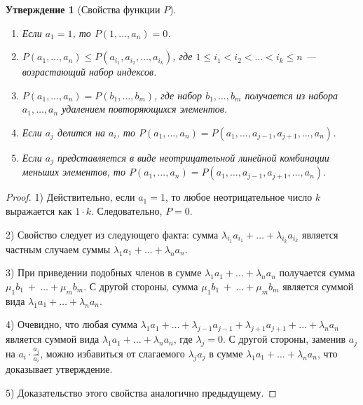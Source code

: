 \documentclass[12pt]{article}
\newtheorem{proposition}[theorem]{Утверждение}
\theoremstyle{definition}
\begin{document}
\begin{proposition}[Свойства функции $P$]{\ }
\label{propertiesOfP}
\begin{enumerate}
    \item Если $a_1 = 1$, то $P(1, \dots, a_n) = 0$.
    \item $P(a_1, \dots, a_n) \le P(a_{i_1} , a_{i_2}, \dots, a_{i_k})$, где $1 \le i_1 < i_2 < \dots < i_k \le n$ --- возрастающий набор индексов.
    \item $P(a_1, \dots, a_n) = P(b_1, \dots, b_m)$, где набор $b_1, \dots, b_m$ получается из набора $a_1, \dots, a_n$ удалением повторяющихся элементов.
    \item Если $a_j$ делится на $a_i$, то $P(a_1, \dots, a_n) = P(a_1, \dots, a_{j - 1}, a_{j + 1}, \dots, a_n)$.
    
    \item Если $a_j$ представляется в виде неотрицательной линейной комбинации меньших элементов, то $P(a_1, \dots, a_n) = P(a_1, \dots, a_{j - 1}, a_{j + 1}, \dots, a_n)$.
\end{enumerate}
\end{proposition}
\begin{proof}
1) Действительно, если $a_1 = 1$, то любое неотрицательное число $k$ выражается как $1 \cdot k$. Следовательно, $P = 0$.

2) Свойство следует из следующего факта: сумма $\lambda_{i_1} a_{i_1} + \dots + \lambda_{i_k} a_{i_k}$ является частным случаем суммы $\lambda_1 a_1 + \dots + \lambda_n a_n$.

3) При приведении подобных членов в сумме $\lambda_1 a_1 + \dots + \lambda_n a_n$ получается сумма $\mu_1 b_1~+~\dots + \mu_m b_m$. С другой стороны, сумма $\mu_1 b_1~+~\dots + \mu_m b_m$ является суммой вида $\lambda_1 a_1 + \dots + \lambda_n a_n$.

4) Очевидно, что любая сумма $\lambda_1 a_1 + \dots + \lambda_{j - 1} a_{j - 1} + \lambda_{j + 1} a_{j + 1} + \dots + \lambda_n a_n$ является суммой вида $\lambda_1 a_1 + \dots + \lambda_n a_n$, где $\lambda_j = 0$. С другой стороны, заменив $a_j$ на $a_i \cdot \frac{a_j}{a_i}$, можно избавиться от слагаемого $\lambda_j a_j$ в сумме $\lambda_1 a_1 + \dots + \lambda_n a_n$, что доказывает утверждение.

5) Доказательство этого свойства аналогично предыдущему.
\end{proof}
\end{document}

